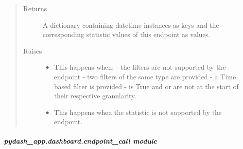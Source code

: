 \documentclass[letterpaper,10pt,english]{sphinxmanual}
\begin{document}
\begin{fulllineitems}
\begin{fulllineitems}
\begin{quote}
\begin{description}
\begin{itemize}
\end{itemize}

\item[{Returns}] \leavevmode
A dictionary containing datetime instances as keys and the corresponding statistic values of this endpoint as values.

\item[{Raises}] \leavevmode\begin{itemize}
\item {} 
 \textendash{} This happens when:
- the filters are not supported by the endpoint
- two filters of the same type are provided
- a Time based filter is provided
-  is True and  or  are not at the start of their respective granularity.

\item {} 
 \textendash{} This happens when the statistic is not supported by the endpoint.

\end{itemize}

\end{description}\end{quote}

\end{fulllineitems}


\end{fulllineitems}



\subparagraph{pydash\_app.dashboard.endpoint\_call module}
\label{\detokenize{pydash_app.dashboard.endpoint_call:module-pydash_app.dashboard.endpoint_call}}\label{\detokenize{pydash_app.dashboard.endpoint_call:pydash-app-dashboard-endpoint-call-module}}\label{\detokenize{pydash_app.dashboard.endpoint_call::doc}}
\end{document}
